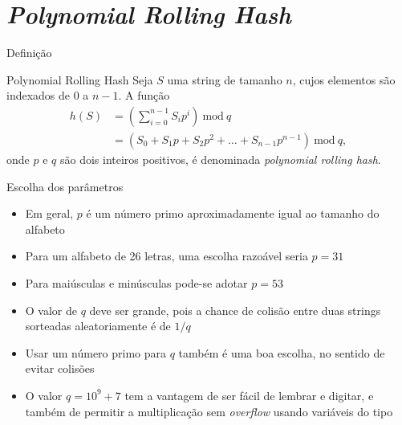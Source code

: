 \section{{\it Polynomial Rolling Hash}}

\begin{frame}[fragile]{Definição}

    \begin{block}{Polynomial Rolling Hash}
    Seja $S$ uma string de tamanho $n$, cujos elementos são indexados de 0 a $n - 1$. A função 
    \begin{align*}
        h(S) &= \left(\sum_{i=0}^{n - 1} S_ip^i\right)\ \mbox{mod}\ q \\
        &= \left(S_0 + S_1p + S_2p^2 + \ldots + S_{n-1}p^{n-1}\right)\ \mbox{mod}\ q,
    \end{align*}
    onde $p$ e $q$ são dois inteiros positivos, é denominada \textit{polynomial rolling hash}.
    \end{block}

\end{frame}

\begin{frame}[fragile]{Escolha dos parâmetros}

    \begin{itemize}
        \item Em geral, $p$ é um número primo aproximadamente igual ao tamanho do alfabeto
        \pause

        \item Para um alfabeto de 26 letras, uma escolha razoável seria $p = 31$
        \pause

        \item Para maiúsculas e minúsculas pode-se adotar $p = 53$
        \pause

        \item O valor de $q$ deve ser grande, pois a chance de colisão entre duas strings
            sorteadas aleatoriamente é de $1/q$
        \pause

        \item Usar um número primo para $q$ também é uma boa escolha, no sentido de evitar 
            colisões
        \pause


        \item O valor $q = 10^9 + 7$ tem a vantagem de ser fácil de lembrar e digitar, e também
            de permitir a multiplicação sem \textit{overflow} usando variáveis do tipo
    \end{itemize}

\end{frame}

